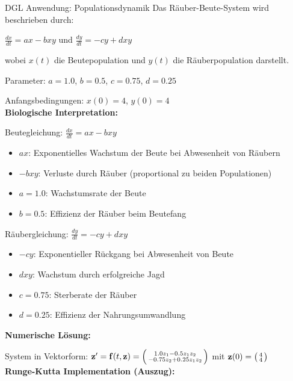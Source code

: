 \begin{example2}{DGL Anwendung: Populationsdynamik}
Das Räuber-Beute-System wird beschrieben durch:

$\frac{dx}{dt} = ax - bxy$ und
$\frac{dy}{dt} = -cy + dxy$

wobei $x(t)$ die Beutepopulation und $y(t)$ die Räuberpopulation darstellt.

Parameter: $a = 1.0$, $b = 0.5$, $c = 0.75$, $d = 0.25$

Anfangsbedingungen: $x(0) = 4$, $y(0) = 4$
\vspace{1mm}\\
\textbf{Biologische Interpretation:}

Beutegleichung: $\frac{dx}{dt} = ax - bxy$
\begin{itemize}
    \item $ax$: Exponentielles Wachstum der Beute bei Abwesenheit von Räubern
    \item $-bxy$: Verluste durch Räuber (proportional zu beiden Populationen)
    \item $a = 1.0$: Wachstumsrate der Beute
    \item $b = 0.5$: Effizienz der Räuber beim Beutefang
\end{itemize}

Räubergleichung: $\frac{dy}{dt} = -cy + dxy$
\begin{itemize}
    \item $-cy$: Exponentieller Rückgang bei Abwesenheit von Beute
    \item $dxy$: Wachstum durch erfolgreiche Jagd
    \item $c = 0.75$: Sterberate der Räuber
    \item $d = 0.25$: Effizienz der Nahrungsumwandlung
\end{itemize}
\vspace{1mm}
\textbf{Numerische Lösung:}

System in Vektorform:
$\mathbf{z}' = \mathbf{f}(t, \mathbf{z}) = \begin{psmallmatrix}
1.0 z_1 - 0.5 z_1 z_2 \\
-0.75 z_2 + 0.25 z_1 z_2
\end{psmallmatrix}$
mit $\mathbf{z}(0) = \begin{psmallmatrix} 4 \\ 4 \end{psmallmatrix}$
\vspace{1mm}\\
\textbf{Runge-Kutta Implementation (Auszug):}


\end{example2}
